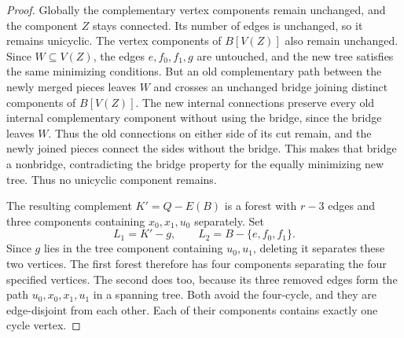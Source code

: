 \documentclass[USenglish, a4paper, thm-restate,numberwithinsect, cleveref]{lipics-v2021}
\begin{document}
\begin{proof}
Globally the complementary vertex components remain unchanged, and
the component $Z$ stays connected. Its number of edges is unchanged,
so it remains unicyclic. The vertex components of $B[V(Z)]$ also remain
unchanged. Since $W\subseteq V(Z)$, the edges $e,f_0,f_1,g$ are untouched,
and the new tree satisfies the same minimizing conditions.
But an old complementary path
between the newly merged pieces leaves $W$ and crosses an unchanged
bridge joining distinct components of $B[V(Z)]$. The new internal
connections preserve every old internal complementary component
without using the bridge, since the bridge leaves $W$. Thus the
old connections on either side of its cut remain, and the newly
joined pieces connect the sides without the bridge. This makes
that bridge a nonbridge, contradicting the bridge
property for the equally minimizing new tree. Thus no unicyclic
component remains.

The resulting complement $K'=Q-E(B)$ is a forest with $r-3$ edges and three
components containing $x_0,x_1,u_0$ separately. Set
\[
 L_1=K'-g,\qquad L_2=B-\{e,f_0,f_1\}.
\]
Since $g$ lies in the tree component containing $u_0,u_1$, deleting it
separates these two vertices. The first forest therefore has four
components separating the four specified vertices.
The second does too, because its three removed edges form the path
$u_0,x_0,x_1,u_1$ in a spanning tree. Both avoid the four-cycle,
and they are edge-disjoint from each other. Each of their components
contains exactly one cycle vertex.
\end{proof}
\end{document}

